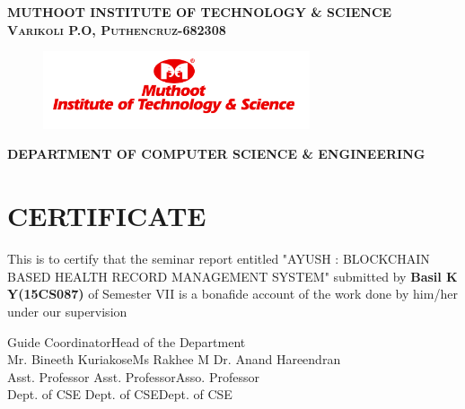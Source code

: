 \documentclass[12pt]{report}
\begin{document}
\newpage\begin{titlepage}
\center


\textsc{ \textbf{MUTHOOT INSTITUTE OF TECHNOLOGY \& SCIENCE}}\\
\textsc{\textbf{Varikoli P.O, Puthencruz-682308}}
\vspace{0.7cm}
\begin{figure}[H]
\centering
\includegraphics[width=0.7\textwidth]{logo.png}\\
\end{figure}
\vspace{0.2cm}
\textsc{ \small \textbf{ DEPARTMENT OF COMPUTER SCIENCE \& ENGINEERING}}\\
\section*{\centering CERTIFICATE}
\begin{center}
 This is to certify that the seminar report entitled "AYUSH : BLOCKCHAIN BASED HEALTH RECORD MANAGEMENT SYSTEM" submitted by \textbf{Basil K Y(15CS087)} of Semester VII is  a bonafide account of the work done by him/her under our supervision\\
\end{center}
\vspace{1.6cm}




\noindent Guide \hspace{3.6cm} Coordinator\hfill Head of the Department
\\
\noindent Mr. Bineeth Kuriakose\hspace{0.82cm}Ms Rakhee M \hfill Dr. Anand Hareendran\\
\noindent Asst. Professor\hspace{2.10cm} Asst. Professor\hfill Asso. Professor\\
\noindent Dept. of CSE\hspace{2.39cm} Dept. of CSE\hfill Dept. of CSE




\end{titlepage}
\newpage
{}
\end{document}
